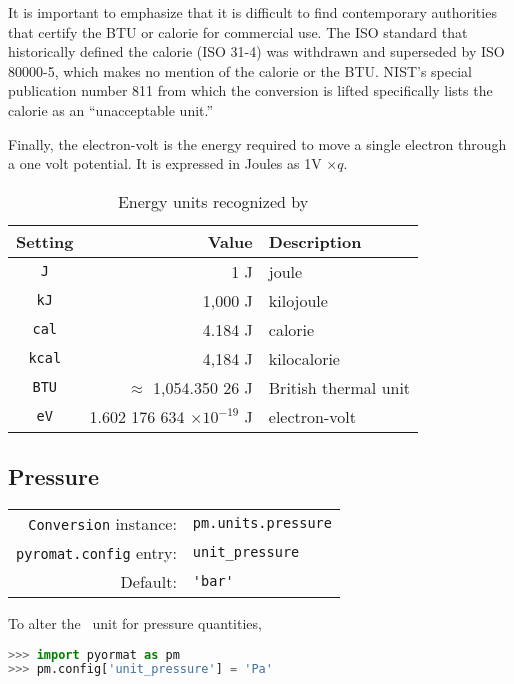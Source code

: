 It is important to emphasize that it is difficult to find contemporary authorities that certify the BTU or calorie for commercial use.  The ISO standard that historically defined the calorie (ISO 31-4) was withdrawn and superseded by ISO 80000-5, which makes no mention of the calorie or the BTU.  NIST's special publication number 811 from which the conversion is lifted specifically lists the calorie as an ``unacceptable unit.''

Finally, the electron-volt is the energy required to move a single electron through a one volt potential.  It is expressed in Joules as 1V $\times q$.

\begin{table}
\centering
\caption{Energy units recognized by \PM}\label{tab:energy}
\begin{tabular}{crl}
\hline
Setting & Value & Description\\
\hline
\verb|J| & 1 J & joule\\
\verb|kJ| & 1,000 J & kilojoule\\
\verb|cal| & 4.184 J & calorie\\
\verb|kcal| & 4,184 J & kilocalorie\\
\verb|BTU| & $\approx$ 1,054.350 26 J & British thermal unit\\
\verb|eV| & 1.602 176 634 $\times 10^{-19}$ J & electron-volt\\
\hline
\end{tabular}
\end{table}

%
%

\subsection{Pressure}\label{sec:units:pressure}

\begin{tabular}{rl}
\hline
\verb|Conversion| instance: & \verb|pm.units.pressure|\\
\verb|pyromat.config| entry: & \verb|unit_pressure|\\
Default: & \verb|'bar'|\\
\hline
\end{tabular}
\vspace{1em}

To alter the \PM\ unit for pressure quantities,
\begin{lstlisting}[language=Python]
>>> import pyormat as pm
>>> pm.config['unit_pressure'] = 'Pa'
\end{lstlisting}

